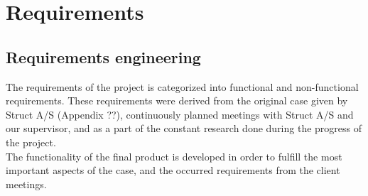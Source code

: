 
\chapter{Requirements} %

\label{Chapter3} %


\section{Requirements engineering}
The requirements of the project is categorized into functional and non-functional requirements. These requirements were derived from the original case given by Struct A/S (Appendix ??), continuously planned meetings with Struct A/S and our supervisor, and as a part of the constant research done during the progress of the project. \\
The functionality of the final product is developed in order to fulfill the most important aspects of the case, and the occurred requirements from the client meetings.

